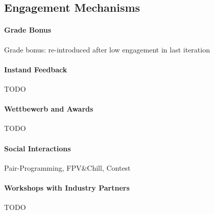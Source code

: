 \subsection{Engagement Mechanisms}

\paragraph{Grade Bonus}
Grade bonus: re-introduced after low engagement in last iteration

\paragraph{Instand Feedback}
TODO

\paragraph{Wettbewerb and Awards}
TODO

\paragraph{Social Interactions}
Pair-Programming, FPV\&Chill, Contest

\paragraph{Workshops with Industry Partners}
TODO

